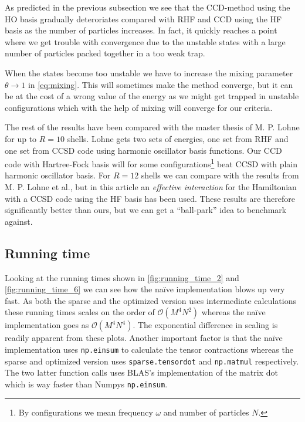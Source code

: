 \documentclass[
    a4paper, aps, twocolumn, floatfix, superscriptaddress,
    nofootinbib]{revtex4-1}
\newcommand{\1}{\mathds{1}}
\begin{document}
        As predicted in the previous subsection we see that the CCD-method using
        the HO basis gradually deteroriates compared with RHF and CCD using the
        HF basis as the number of particles increases. In fact, it quickly
        reaches a point where we get trouble with convergence due to the
        unstable states with a large number of particles packed together in a
        too weak trap.

        When the states become too unstable we have to increase the mixing
        parameter $\theta \to 1$ in \autoref{eq:mixing}. This will sometimes
        make the method converge, but it can be at the cost of a wrong value of
        the energy as we might get trapped in unstable configurations which with
        the help of mixing will converge for our criteria.

        The rest of the results have been compared with the master thesis of M.
        P.  Lohne\cite{lohne2010coupled} for up to $R = 10$ shells. Lohne gets
        two sets of energies, one set from RHF and one set from CCSD code using
        harmonic oscillator basis functions. Our CCD code with Hartree-Fock
        basis will for some configurations\footnote{By configurations we mean
        frequency $\omega$ and number of particles $N$.} beat CCSD with plain
        harmonic oscillator basis. For $R = 12$ shells we can compare with the
        results from M. P. Lohne et al.\cite{lohne2011ab}, but in this article
        an \emph{effective interaction} for the Hamiltonian with a CCSD code
        using the HF basis has been used. These results are therefore
        significantly better than ours, but we can get a ``ball-park'' idea to
        benchmark against.

    \subsection{Running time}
        Looking at the running times shown in \autoref{fig:running_time_2} and
        \autoref{fig:running_time_6} we can see how the naïve implementation
        blows up very fast. As both the sparse and the optimized version uses
        intermediate calculations these running times scales on the order of
        $\mathcal{O}(M^4N^2)$ whereas the naïve implementation goes as
        $\mathcal{O}(M^4N^4)$. The exponential difference in scaling is readily
        apparent from these plots. Another important factor is that the naïve
        implementation uses \texttt{np.einsum} to calculate the tensor
        contractions whereas the sparse and optimized version uses
        \texttt{sparse.tensordot} and \texttt{np.matmul} respectively. The two
        latter function calls uses BLAS's implementation of the matrix dot which
        is way faster than Numpys \texttt{np.einsum}.
\end{document}
